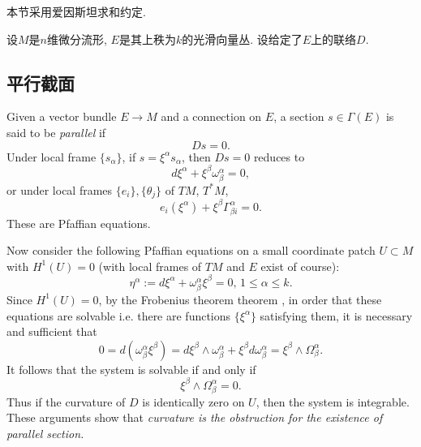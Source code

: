 
本节采用爱因斯坦求和约定.

设$M$是$n$维微分流形, $E$是其上秩为$k$的光滑向量丛. 设给定了$E$上的联络$D$.

\subsection{平行截面}

Given a vector bundle $E\to M$ and a connection on $E$, a section $s\in\Gamma(E)$ is said to be \emph{parallel} if
$$Ds=0.$$
Under local frame $\{s_\alpha\}$, if $s=\xi^\alpha s_\alpha$, then $Ds=0$ reduces to
$$d\xi^\alpha+\xi^\beta\omega^\alpha_\beta=0,$$
or under local frames $\{e_i\},\{\theta_j\}$ of $TM$, $T^*M$,
$$e_i(\xi^\alpha)+\xi^\beta\Gamma^\alpha_{\beta i}=0.$$
These are Pfaffian equations.

Now consider the following Pfaffian equations on a small coordinate patch $U\subset M$ with $H^1(U)=0$ (with local frames of $TM$ and $E$ exist of course):
$$\eta^\alpha:=d\xi^\alpha+\omega^\alpha_\beta\xi^\beta=0,\,1\leq\alpha\leq k.$$
Since $H^1(U)=0$, by the Frobenius theorem theorem , in order that these equations are solvable i.e. there are functions $\{\xi^\alpha\}$ satisfying them, it is necessary and sufficient that
$$0=d(\omega^\alpha_\beta\xi^\beta)=d\xi^\beta\wedge\omega^\alpha_\beta+\xi^\beta d\omega^\alpha_\beta=\xi^\beta\wedge\Omega_\beta^\alpha.$$
It follows that the system is solvable if and only if
$$\xi^\beta\wedge\Omega_\beta^\alpha=0.$$
Thus if the curvature of $D$ is identically zero on $U$, then the system is integrable. These arguments show that \emph{curvature is the obstruction for the existence of parallel section.}

